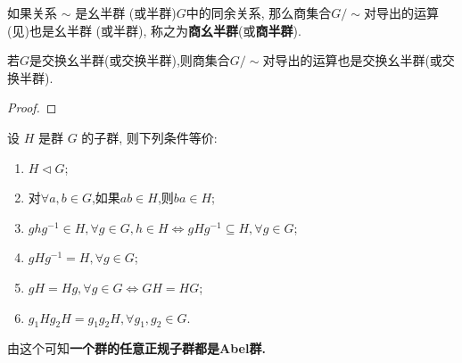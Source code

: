 \documentclass[../../main.tex]{subfiles}%
\begin{document}
\begin{theorem}\label{theorem:抽象代数--半群中的同余关系可导出商集合也是商半群}
如果关系 \( \sim \) 是幺半群 (或半群)$G$中的同余关系, 那么商集合$G/\sim$对导出的运算(见)也是幺半群 (或半群), 称之为\textbf{商幺半群}(或\textbf{商半群}). 

若$G$是交换幺半群(或交换半群),则商集合$G/\sim$对导出的运算也是交换幺半群(或交换半群).
\end{theorem}
\begin{proof}



\end{proof}

\begin{theorem}\label{theorem:抽象代数-定理 1.3.5}
设 \( H \) 是群 \( G \) 的子群, 则下列条件等价:
\begin{enumerate}[(1)]
\item\label{theorem:抽象代数-定理 1.3.5-1} \( H \lhd  G \);

\item\label{theorem:抽象代数-定理 1.3.5-3} 对$\forall a,b\in G$,如果$ab\in H$,则$ba\in H$;

\item\label{theorem:抽象代数-定理 1.3.5-2} $g h g^{-1} \in H,\forall g \in G, h \in H\iff gHg^{-1}\subseteq H,\forall g\in G$;

\item\label{theorem:抽象代数-定理 1.3.5-4} \( gHg^{-1} = H, \forall g \in G \);

\item\label{theorem:抽象代数-定理 1.3.5-5} \( gH = Hg, \forall g \in G \iff GH=HG\);

\item\label{theorem:抽象代数-定理 1.3.5-6} \( g_1Hg_2H = g_1g_2H, \forall g_1, g_2 \in G \).
\end{enumerate}
\end{theorem}
\begin{remark}
由这个可知\textbf{一个群的任意正规子群都是Abel群.}
\end{remark}
\end{document}
